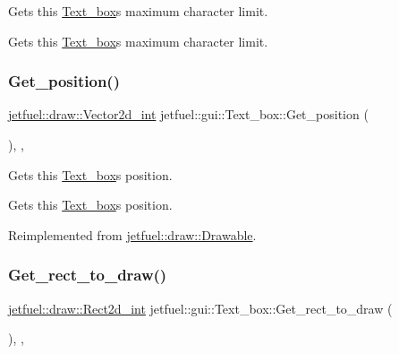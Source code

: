 Gets this \hyperlink{classjetfuel_1_1gui_1_1Text__box}{Text\+\_\+box}\textquotesingle{}s maximum character limit. 

Gets this \hyperlink{classjetfuel_1_1gui_1_1Text__box}{Text\+\_\+box}\textquotesingle{}s maximum character limit. \mbox{\label{classjetfuel_1_1gui_1_1Text__box_ae59b52ecc11c9664307013e376f2cb29}} 
\subsubsection{\texorpdfstring{Get\+\_\+position()}{Get\_position()}}
{\footnotesize\ttfamily \hyperlink{classjetfuel_1_1draw_1_1Vector2d}{jetfuel\+::draw\+::\+Vector2d\+\_\+int} jetfuel\+::gui\+::\+Text\+\_\+box\+::\+Get\+\_\+position (\begin{DoxyParamCaption}{ }\end{DoxyParamCaption})\hspace{0.3cm}{\ttfamily [inline]}, {\ttfamily [override]}, {\ttfamily [virtual]}}



Gets this \hyperlink{classjetfuel_1_1gui_1_1Text__box}{Text\+\_\+box}\textquotesingle{}s position. 

Gets this \hyperlink{classjetfuel_1_1gui_1_1Text__box}{Text\+\_\+box}\textquotesingle{}s position. 

Reimplemented from \hyperlink{classjetfuel_1_1draw_1_1Drawable_ae7ebd30d66db2c8a5d5371cbcf0023fc}{jetfuel\+::draw\+::\+Drawable}.

\mbox{\label{classjetfuel_1_1gui_1_1Text__box_ae4cec83c8751ad592f1005e7c7c6441b}} 
\subsubsection{\texorpdfstring{Get\+\_\+rect\+\_\+to\+\_\+draw()}{Get\_rect\_to\_draw()}}
{\footnotesize\ttfamily \hyperlink{classjetfuel_1_1draw_1_1Rect2d}{jetfuel\+::draw\+::\+Rect2d\+\_\+int} jetfuel\+::gui\+::\+Text\+\_\+box\+::\+Get\+\_\+rect\+\_\+to\+\_\+draw (\begin{DoxyParamCaption}{ }\end{DoxyParamCaption})\hspace{0.3cm}{\ttfamily [inline]}, {\ttfamily [override]}, {\ttfamily [virtual]}}



